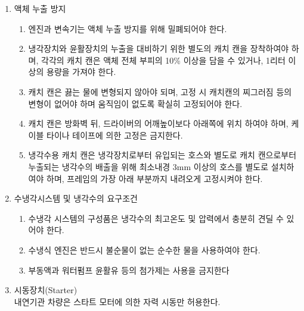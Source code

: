 \documentclass[final,a4paper,10pt]{report}
\begin{document}
\begin{enumerate}
  \item 액체 누출 방지
    \begin{enumerate}
      \item 엔진과 변속기는 액체 누출 방지를 위해 밀폐되어야 한다.
      \item 냉각장치와 윤활장치의 누출을 대비하기 위한 별도의 캐치 캔을 장착하여야 하며, 각각의 캐치 캔은 액체 전체 부피의 10\% 이상을 담을 수 있거나, 1리터 이상의 용량을 가져야 한다.
      \item 캐치 캔은 끓는 물에 변형되지 않아야 되며, 고정 시 캐치캔의 찌그러짐 등의 변형이 없어야 하며 움직임이 없도록 확실히 고정되어야 한다.
      \item 캐치 캔은 방화벽 뒤, 드라이버의 어깨높이보다 아래쪽에 위치 하여야 하며, 케이블 타이나 테이프에 의한 고정은 금지한다.
      \item 냉각수용 캐치 캔은 냉각장치로부터 유입되는 호스와 별도로 캐치 캔으로부터 누출되는 냉각수의 배출을 위해 최소내경 3mm 이상의 호스를 별도로 설치하여야 하며, 프레임의 가장 아래 부분까지 내려오게 고정시켜야 한다.
    \end{enumerate}
  \item 수냉각시스템 및 냉각수의 요구조건
    \begin{enumerate}
      \item 수냉각 시스템의 구성품은 냉각수의 최고온도 및 압력에서 충분히 견딜 수 있어야 한다.
      \item 수냉식 엔진은 반드시 불순물이 없는 순수한 물을 사용하여야 한다.
      \item 부동액과 워터펌프 윤활유 등의 첨가제는 사용을 금지한다
    \end{enumerate}
  \item 시동장치(Starter)\\
    내연기관 차량은 스타트 모터에 의한 자력 시동만 허용한다.
\end{enumerate}
\end{document}
